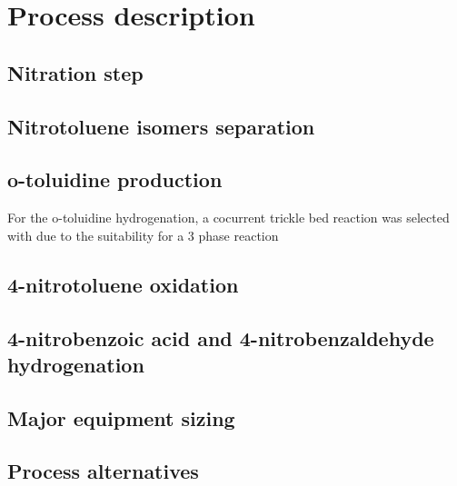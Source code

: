 \section{Process description}
\label{sec:process}
\subsection{Nitration step}

\subsection{Nitrotoluene isomers separation}



\subsection{o-toluidine production}
For the o-toluidine hydrogenation, a cocurrent trickle bed reaction was selected
with 
due to the suitability for a 3 phase reaction 

\subsection{4-nitrotoluene oxidation}

\subsection{4-nitrobenzoic acid and 4-nitrobenzaldehyde hydrogenation}


\subsection{Major equipment sizing}


\subsection{Process alternatives}



